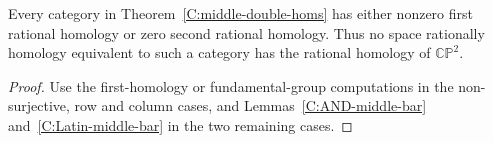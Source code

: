 \begin{corollary}
\label{C:middle-double-homs-rational}
Every category in Theorem~\ref{C:middle-double-homs} has
either nonzero first rational homology or zero second
rational homology.  Thus no space rationally homology
equivalent to such a category has the rational homology
of $\mathbb{CP}^2$.
\end{corollary}
\begin{proof}
Use the first-homology or fundamental-group computations
in the non-surjective, row and column cases, and
Lemmas~\ref{C:AND-middle-bar} and~\ref{C:Latin-middle-bar}
in the two remaining cases.
\end{proof}
